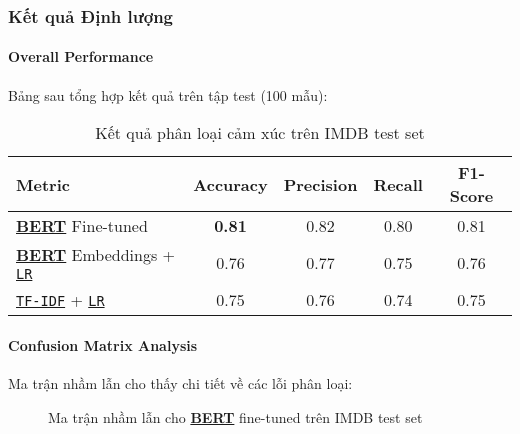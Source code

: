 \subsubsection{Kết quả Định lượng}

\paragraph{Overall Performance}
Bảng sau tổng hợp kết quả trên tập test (100 mẫu):

\begin{table}[H]
\centering
\caption{Kết quả phân loại cảm xúc trên IMDB test set}
\label{tab:results_summary}
\begin{tabular}{lcccc}
\toprule
\textbf{Metric} & \textbf{Accuracy} & \textbf{Precision} & \textbf{Recall} & \textbf{F1-Score} \\
\midrule
\hyperref[acro:bert]{\textbf{BERT}} Fine-tuned & \textbf{0.81} & 0.82 & 0.80 & 0.81 \\
\hyperref[acro:bert]{\textbf{BERT}} Embeddings + \hyperref[acro:lr]{\texttt{LR}} & 0.76 & 0.77 & 0.75 & 0.76 \\
\hyperref[acro:tfidf]{\texttt{TF-IDF}} + \hyperref[acro:lr]{\texttt{LR}} & 0.75 & 0.76 & 0.74 & 0.75 \\
\bottomrule
\end{tabular}
\end{table}

\paragraph{Confusion Matrix Analysis}
Ma trận nhầm lẫn cho thấy chi tiết về các lỗi phân loại:

\begin{figure}[H]
\centering
{}
\caption{Ma trận nhầm lẫn cho \hyperref[acro:bert]{\textbf{BERT}} fine-tuned trên IMDB test set}
\label{fig:confusion_matrix}
\end{figure}

